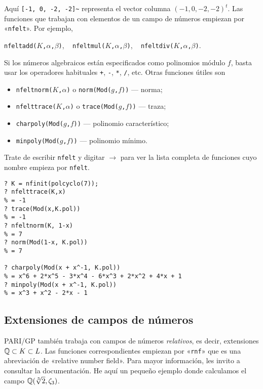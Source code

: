 Aquí \texttt{[-1, 0, -2, -2]\textasciitilde} representa el vector columna
$(-1,0,-2,-2)^t$. Las funciones que trabajan con elementos de un campo de
números empiezan por «\texttt{nfelt}». Por ejemplo,
\begin{center}
\texttt{nfeltadd($K$,$\alpha$,$\beta$)}, ~
\texttt{nfeltmul($K$,$\alpha$,$\beta$)}, ~
\texttt{nfeltdiv($K$,$\alpha$,$\beta$)}.
\end{center}
Si los números algebraicos están especificados como polinomios módulo $f$, basta
usar los operadores habituales \texttt{+}, \texttt{-}, \texttt{*}, \texttt{/},
etc. Otras funciones útiles son
\begin{itemize}
\item \texttt{nfeltnorm($K$,$\alpha$)} o \texttt{norm(Mod($g$,$f$))} --- norma;
\item \texttt{nfelttrace($K$,$\alpha$)} o \texttt{trace(Mod($g$,$f$))} --- traza;
\item \texttt{charpoly(Mod($g$,$f$))} --- polinomio característico;
\item \texttt{minpoly(Mod($g$,$f$))} --- polinomio mínimo.
\end{itemize}
Trate de escribir \texttt{nfelt} y digitar $\boxed{\to}$ para ver la lista
completa de funciones cuyo nombre empieza por \texttt{nfelt}.

\begin{shaded}
\begin{verbatim}
? K = nfinit(polcyclo(7));
? nfelttrace(K,x)
% = -1
? trace(Mod(x,K.pol))
% = -1
? nfeltnorm(K, 1-x)
% = 7
? norm(Mod(1-x, K.pol))
% = 7

? charpoly(Mod(x + x^-1, K.pol))
% = x^6 + 2*x^5 - 3*x^4 - 6*x^3 + 2*x^2 + 4*x + 1
? minpoly(Mod(x + x^-1, K.pol))
% = x^3 + x^2 - 2*x - 1
\end{verbatim}
\end{shaded}


\subsection{Extensiones de campos de números}

PARI/GP también trabaja con campos de números \emph{relativos}, es decir,
extensiones $\mathbb{Q} \subset K \subset L$. Las funciones correspondientes empiezan
por «\texttt{rnf}» que es una abreviación de «relative number field».
Para mayor información, les invito a consultar la documentación. He aquí un
pequeño ejemplo donde calculamos el campo $\mathbb{Q} (\sqrt[3]{2},\zeta_3)$.

